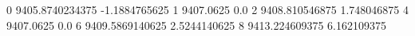 0 9405.8740234375 -1.1884765625
1 9407.0625 0.0
2 9408.810546875 1.748046875
4 9407.0625 0.0
6 9409.5869140625 2.5244140625
8 9413.224609375 6.162109375
